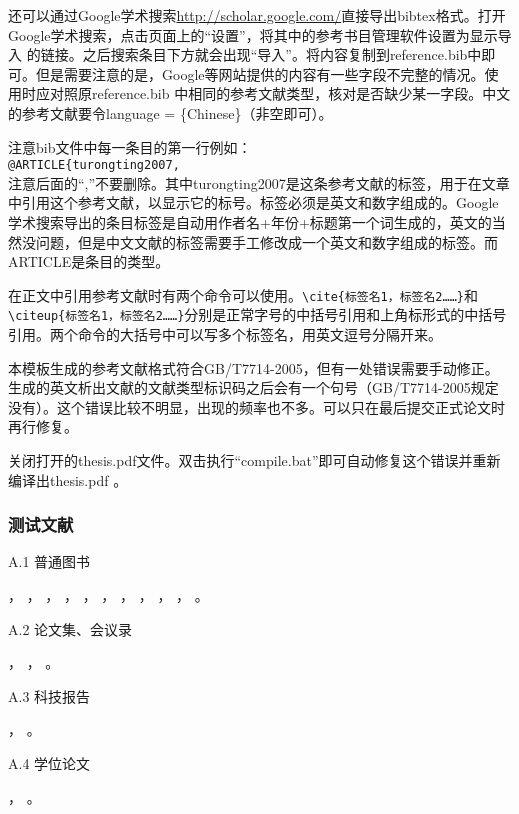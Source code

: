 还可以通过Google学术搜索\url{http://scholar.google.com/}直接导出bibtex格式。打开Google学术搜索，点击页面上的“设置”，将其中的参考书目管理软件设置为显示导入\BibTeX{} 的链接。之后搜索条目下方就会出现“导入\BibTeX{}”。将内容复制到reference.bib中即可。但是需要注意的是，Google等网站提供的内容有一些字段不完整的情况。使用时应对照原reference.bib 中相同的参考文献类型，核对是否缺少某一字段。中文的参考文献要令language = \{Chinese\}（非空即可）。

注意bib文件中每一条目的第一行例如：\\
\verb|@ARTICLE{turongting2007,|\\
注意后面的“,”不要删除。其中turongting2007是这条参考文献的标签，用于在文章中引用这个参考文献，以显示它的标号。标签必须是英文和数字组成的。Google学术搜索导出的条目标签是自动用作者名+年份+标题第一个词生成的，英文的当然没问题，但是中文文献的标签需要手工修改成一个英文和数字组成的标签。而ARTICLE是条目的类型。

在正文中引用参考文献时有两个命令可以使用。\verb|\cite{标签名1，标签名2……}|和\verb|\citeup{标签名1，标签名2……}|分别是正常字号的中括号引用和上角标形式的中括号引用。两个命令的大括号中可以写多个标签名，用英文逗号分隔开来。\par

本模板生成的参考文献格式符合GB/T7714-2005，但有一处错误需要手动修正。生成的英文析出文献的文献类型标识码之后会有一个句号（GB/T7714-2005规定没有）。这个错误比较不明显，出现的频率也不多。可以只在最后提交正式论文时再行修复。

关闭打开的thesis.pdf文件。双击执行“compile.bat”即可自动修复这个错误并重新编译出thesis.pdf 。

\subsubsection{测试文献}


A.1 普通图书

\cite{gxzzzzqlyt1993}，
\cite{jiangyouxu1998}，
\cite{tangxujun1999}，
\cite{zhaokaihua1995}，
\cite{wangang1912}，
\cite{zhaoyaodong1998}，
\cite{crawfprd1995}，
\cite{iflai1977}，
\cite{obrien1994}，
\cite{rood2001}，
\cite{angwen1988}。

A.2 论文集、会议录

\cite{zglxxh1990}，
\cite{ROSENTHALL1963}，
\cite{GANZHA2000}。

A.3 科技报告

\cite{dtha1990}，
\cite{who1970}。

A.4 学位论文

\cite{ZHANGZHIXIANG1998}，
\cite{CALMS1965}。

